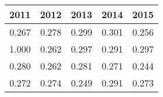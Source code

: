 \begin{tabular}{rrrrr}
\toprule
2011 & 2012 & 2013 & 2014 & 2015 \\
\midrule
0.267 & 0.278 & 0.299 & 0.301 & 0.256 \\
1.000 & 0.262 & 0.297 & 0.291 & 0.297 \\
0.280 & 0.262 & 0.281 & 0.271 & 0.244 \\
0.272 & 0.274 & 0.249 & 0.291 & 0.273 \\
\bottomrule
\end{tabular}
